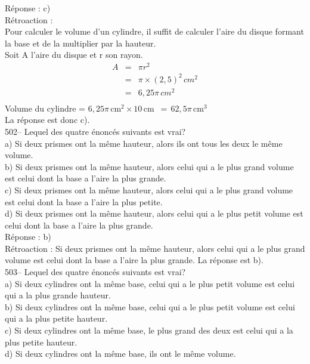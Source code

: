 ﻿\documentclass[letterpaper, 12pt]{article}
\begin{document}
R\'eponse : c)\\

R\'etroaction : \\
Pour calculer le volume d'un cylindre, il suffit de calculer l'aire du
disque formant la base et de la multiplier par la hauteur.  \\
Soit A l'aire du disque et r son rayon.
\begin{eqnarray*}
A &=& \pi r^{2} \\
&=& \pi \times \left( 2,5\right)^{2}\,cm^{2}\\
&=& 6,25\pi\,cm^{2}\\
\end{eqnarray*}
Volume du cylindre = $6,25\pi$\,cm$^{2} \times 10$\,cm
$\,=\,62,5\pi$\,cm$^{3}$\\
La r\'eponse est donc c).\\


502-- Lequel des quatre \'enonc\'es suivants est vrai?\\
a) Si deux prismes ont la m\^eme hauteur, alors ils ont tous les deux le
m\^eme volume.\\
b) Si deux prismes ont la m\^eme hauteur, alors celui qui a le plus grand
volume est celui dont la base a l'aire la plus grande.\\
c) Si deux prismes ont la m\^eme hauteur, alors celui qui a le plus grand
volume est celui dont la base a l'aire la plus petite.\\
d) Si deux prismes ont la m\^eme hauteur, alors celui qui a le plus petit
volume est celui dont la base a l'aire la plus grande.\\

R\'eponse : b)\\

R\'etroaction :
Si deux prismes ont la m\^eme hauteur, alors celui qui a le plus grand
volume est celui dont la base a l'aire la plus grande. La r\'eponse est
b).\\

503-- Lequel des quatre \'enonc\'es suivants est vrai? \\
a) Si deux cylindres ont la m\^eme base, celui qui a le plus petit volume
est celui qui a la plus grande hauteur.\\
b) Si deux cylindres ont la m\^eme base, celui qui a le plus petit volume
est celui qui a la plus petite hauteur.\\
c) Si deux cylindres ont la m\^eme base, le plus grand des deux est celui
qui a la plus petite hauteur.\\
d) Si deux cylindres ont la m\^eme base, ils ont le m\^eme volume.\\
\end{document}
